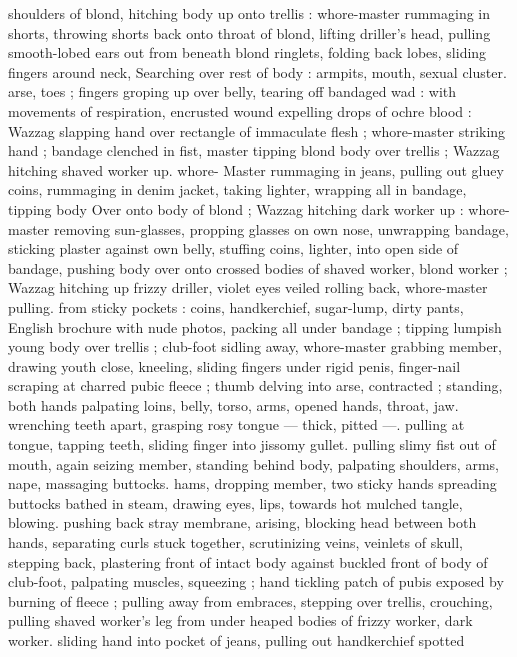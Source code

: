 shoulders of blond, hitching body up onto trellis : whore-master 
rummaging in shorts, throwing shorts back onto throat of blond, 
lifting driller's head, pulling smooth-lobed ears out from beneath 
blond ringlets, folding back lobes, sliding fingers around neck, 
Searching over rest of body : armpits, mouth, sexual cluster. arse, 
toes ; fingers groping up over belly, tearing off bandaged wad : with 
movements of respiration, encrusted wound expelling drops of ochre 
blood : Wazzag slapping hand over rectangle of immaculate flesh ; 
whore-master striking hand ; bandage clenched in fist, master tipping 
blond body over trellis ; Wazzag hitching shaved worker up. whore- 
Master rummaging in jeans, pulling out gluey coins, rummaging in 
denim jacket, taking lighter, wrapping all in bandage, tipping body 
Over onto body of blond ; Wazzag hitching dark worker up : whore- 
master removing sun-glasses, propping glasses on own nose, 
unwrapping bandage, sticking plaster against own belly, stuffing 
coins, lighter, into open side of bandage, pushing body over onto 
crossed bodies of shaved worker, blond worker ; Wazzag hitching up 
frizzy driller, violet eyes veiled rolling back, whore-master pulling. 
from sticky pockets : coins, handkerchief, sugar-lump, dirty pants, 
English brochure with nude photos, packing all under bandage ; 
tipping lumpish young body over trellis ; club-foot sidling away, 
whore-master grabbing member, drawing youth close, kneeling, 
sliding fingers under rigid penis, finger-nail scraping at charred 
pubic fleece ; thumb delving into arse, contracted ; standing, both 
hands palpating loins, belly, torso, arms, opened hands, throat, jaw. 
wrenching teeth apart, grasping rosy tongue --- thick, pitted ---. 
pulling at tongue, tapping teeth, sliding finger into jissomy gullet. 
pulling slimy fist out of mouth, again seizing member, standing 
behind body, palpating shoulders, arms, nape, massaging buttocks. 
hams, dropping member, two sticky hands spreading buttocks bathed 
in steam, drawing eyes, lips, towards hot mulched tangle, blowing. 
pushing back stray membrane, arising, blocking head between both 
hands, separating curls stuck together, scrutinizing veins, veinlets of 
skull, stepping back, plastering front of intact body against buckled 
front of body of club-foot, palpating muscles, squeezing ; hand 
tickling patch of pubis exposed by burning of fleece ; pulling away 
from embraces, stepping over trellis, crouching, pulling shaved 
worker's leg from under heaped bodies of frizzy worker, dark worker. 
sliding hand into pocket of jeans, pulling out handkerchief spotted 
